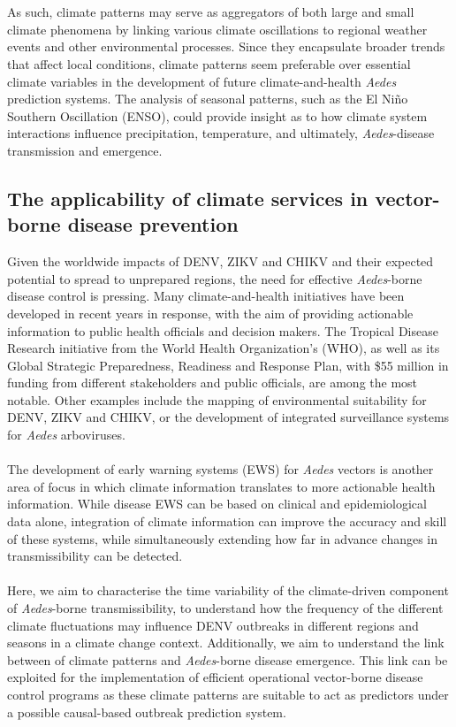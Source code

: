 \documentclass[10pt,twocolumn]{wlscirep}
\begin{document}
\\
\\
As such, climate patterns may serve as aggregators of both large and small climate phenomena by linking various climate oscillations to regional weather events and other environmental processes\cite{lee_2018}. Since they encapsulate broader trends that affect local conditions, climate patterns seem preferable over essential climate variables in the development of future climate-and-health \textit{Aedes} prediction systems\cite{easterbrook_2016, hallett_2004}. The analysis of seasonal patterns, such as the El Niño Southern Oscillation (ENSO), could provide insight as to how climate system interactions influence precipitation, temperature, and ultimately, \textit{Aedes}-disease transmission and emergence.

\subsection{The applicability of climate services in vector-borne disease prevention} \label{sec-climate-services}

Given the worldwide impacts of DENV, ZIKV and CHIKV and their expected potential to spread to unprepared regions, the need for effective \textit{Aedes}-borne disease control is pressing. Many climate-and-health initiatives have been developed in recent years in response, with the aim of providing actionable information to public health officials and decision makers. The Tropical Disease Research initiative from the World Health Organization's (WHO)\cite{keating_2023, ramirez_2017}, as well as its Global Strategic Preparedness, Readiness and Response Plan, with \$55 million in funding from different stakeholders and public officials, are among the most notable. Other examples include the mapping of environmental suitability for DENV, ZIKV and CHIKV\cite{munoz_2020a, guerra_2025}, or the development of integrated surveillance systems for \textit{Aedes} arboviruses\cite{leandro_2024}.
\\
\\
The development of early warning systems (EWS) for \textit{Aedes} vectors is another area of focus in which climate information translates to more actionable health information\cite{ropelewski_1985}. While disease EWS can be based on clinical and epidemiological data alone, integration of climate information can improve the accuracy and skill of these systems, while simultaneously extending how far in advance changes in transmissibility can be detected\cite{thomson_2006, cox_2007}.
\\
\\
Here, we aim to characterise the time variability of the climate-driven component of \textit{Aedes}-borne transmissibility, to understand how the frequency of the different climate fluctuations may influence DENV outbreaks in different regions and seasons in a climate change context. Additionally, we aim to understand the link between of climate patterns and  \textit{Aedes}-borne disease emergence. This link can be exploited for the implementation of efficient operational vector-borne disease control programs as these climate patterns are suitable to act as predictors under a possible causal-based outbreak prediction system.
\end{document}
